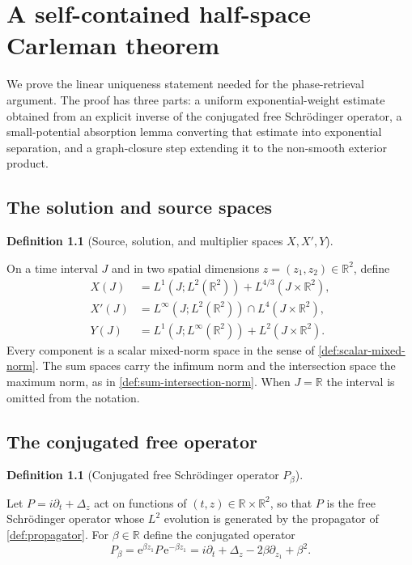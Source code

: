\documentclass[11pt,oneside]{book}
\providecommand{\uses}[1]{}
\theoremstyle{definition}
\newtheorem{definition}[theorem]{Definition}
\theoremstyle{remark}
\newcommand{\R}{\mathbb R}
\newcommand{\1}{\mathbf 1}
\newcommand{\e}{\mathrm e}
\begin{document}
\chapter{A self-contained half-space Carleman theorem}\label{chap:carleman}

We prove the linear uniqueness statement needed for the phase-retrieval argument. The
proof has three parts: a uniform exponential-weight estimate obtained from an explicit
inverse of the conjugated free Schr\"odinger operator, a small-potential absorption lemma
converting that estimate into exponential separation, and a graph-closure step extending it
to the non-smooth exterior product.

\section{The solution and source spaces}

\begin{definition}[Source, solution, and multiplier spaces $X,X',Y$]\label{def:carleman-spaces}
\uses{def:scalar-mixed-norm, def:sum-intersection-norm}
On a time interval $J$ and in two spatial dimensions $z=(z_1,z_2)\in\R^2$, define
\begin{align}
 X(J)  &=L^1(J;L^2(\R^2))+L^{4/3}(J\times\R^2),      \label{eq:X-space}\\
 X'(J) &=L^\infty(J;L^2(\R^2))\cap L^4(J\times\R^2), \label{eq:Xprime-space}\\
 Y(J)  &=L^1(J;L^\infty(\R^2))+L^2(J\times\R^2).     \label{eq:Y-space}
\end{align}
Every component is a scalar mixed-norm space in the sense of
\cref{def:scalar-mixed-norm}. The sum spaces carry the infimum norm and the intersection
space the maximum norm, as in \cref{def:sum-intersection-norm}. When $J=\R$ the interval is
omitted from the notation.
\end{definition}

\section{The conjugated free operator}

\begin{definition}[Conjugated free Schr\"odinger operator $P_\beta$]\label{def:conjugated-operator}
\uses{def:propagator}
Let $P=i\partial_t+\Delta_z$ act on functions of $(t,z)\in\R\times\R^2$, so that $P$ is the
free Schr\"odinger operator whose $L^2$ evolution is generated by the propagator of
\cref{def:propagator}. For $\beta\in\R$ define the conjugated operator
\begin{equation}
 P_\beta=\e^{\beta z_1}P\,\e^{-\beta z_1}
        =i\partial_t+\Delta_z-2\beta\partial_{z_1}+\beta^2. \label{eq:Pbeta}
\end{equation}
\end{definition}
\end{document}
